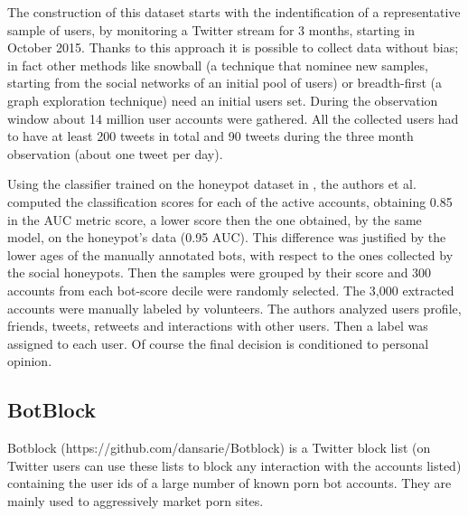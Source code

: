 The construction of this dataset starts with the indentification of a representative sample of users, by monitoring a Twitter stream for 3 months, starting in October 2015. Thanks to this approach it is possible to collect data without bias; in fact other methods like snowball (a technique that nominee new samples, starting from the social networks of an initial pool of users) or breadth-first (a graph exploration technique) need an initial users set.
During the observation window about 14 million user accounts were gathered. 
All the collected users had to have at least 200 tweets in total and 90 tweets during the three month observation (about one tweet per day).

Using the classifier trained on the honeypot dataset in \cite{Lee11sevenmonths}, the authors et al. \cite{Varol} computed the classification scores for each of the active accounts, obtaining 0.85 in the AUC metric score, a lower score then the one obtained, by the same model, on the honeypot's data (0.95 AUC). This difference was justified by the lower ages of the manually annotated bots, with respect to the ones collected by the social honeypots.
Then the samples were grouped by their score and 300 accounts from each bot-score decile were randomly selected. 
The 3,000 extracted accounts were manually labeled by volunteers. The authors analyzed users profile, friends, tweets, retweets and interactions with other users. Then a label was assigned to each user.
Of course the final decision is conditioned to personal opinion.

\subsection{BotBlock}
Botblock (https://github.com/dansarie/Botblock) is a Twitter block list (on Twitter users can use these lists to block any interaction with the accounts listed) containing the user ids of a large number of known porn bot accounts. 
They are mainly used to aggressively market porn sites.

